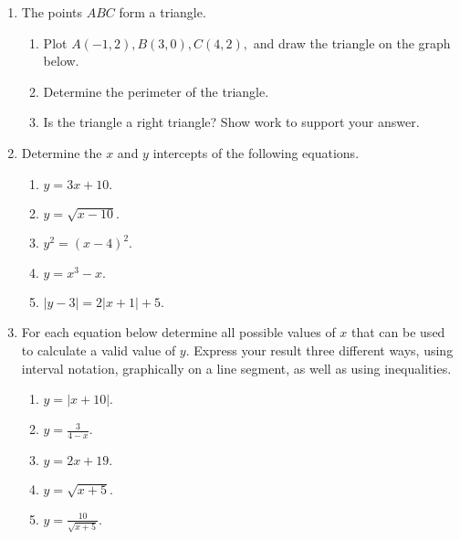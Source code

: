 \begin{enumerate}
\item The points $ABC$ form a triangle.
  \begin{enumerate}
  \item Plot $A(-1,2),B(3,0) , C(4,2), $ and draw the triangle on the graph below.\\

  \item Determine the perimeter of the triangle.
  \item Is the triangle a right triangle?  Show work to support your answer.
  \end{enumerate}

\item Determine the $x$ and $y$ intercepts of the following equations.
  \begin{enumerate}
  \item $\displaystyle y=3x+10.$
  \item $\displaystyle y=\sqrt{x-10}.$
  \item $\displaystyle y^2 = (x-4)^2.$
  \item $\displaystyle y = x^3 - x.$
  \item $\displaystyle |y-3| = 2|x+1| + 5.$
  \end{enumerate}

\item For each equation below determine all possible values of $x$
  that can be used to calculate a valid value of $y$. Express your
  result three different ways, using interval notation, graphically on
  a line segment, as well as using inequalities.
  \begin{enumerate}
  \item $\displaystyle y=|x+10|.$
  \item $\displaystyle y=\frac{3}{4-x}.$
  \item $\displaystyle y=2x+19.$
  \item $\displaystyle y = \sqrt{x+5}.$
  \item $\displaystyle y = \frac{10}{\sqrt{x+5}}.$
  \end{enumerate}


\end{enumerate}

